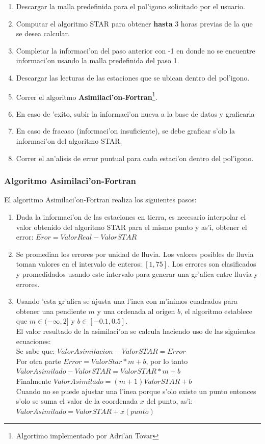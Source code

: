 \begin{enumerate}
 \item Descargar la malla predefinida para el pol'igono solicitado por el usuario.
  \item Computar el algoritmo STAR para obtener \textbf{hasta} 3 horas previas de la que se desea calcular.
  \item Completar la informaci'on del paso anterior con -1 en donde no se encuentre informaci'on usando la malla predefinida del paso 1.
  \item Descargar las lecturas de las estaciones que se ubican dentro del pol'igono.
  \item Correr el algoritmo \textbf{Asimilaci'on-Fortran}\footnote{Algortimo implementado por Adri'an Tovar }.
  \item En caso de 'exito, subir la informaci'on nueva a la base de datos y graficarla
  \item En caso de fracaso (informaci'on insuficiente), se debe graficar s'olo la informaci'on del algoritmo STAR.
  \item Correr el an'alisis de error puntual para cada estaci'on dentro del pol'igono.
\end{enumerate}

\subsubsection*{Algoritmo Asimilaci'on-Fortran}
El algoritmo Asimilaci'on-Fortran realiza los siguientes pasos:
\begin{enumerate}
  \item Dada la informaci'on de las estaciones en tierra, es necesario
    interpolar el valor obtenido del algoritmo STAR para el mismo
    punto y as'i, obtener el error: $Eror=ValorReal-ValorSTAR$ 
  \item Se promedian los errores por unidad de lluvia. Los valores
    posibles de lluvia toman valores en el intervalo de enteros:
    $[1,75]$. Los errores son clasificados y promedidados usando este
    intervalo para generar una gr'afica entre lluvia y errores. 
  \item Usando 'esta gr'afica se ajusta una l'inea con m'inimos cuadrados
    para obtener una pendiente $m$ y una ordenada al origen $b$, el
    algoritmo establece que $m \in (-\infty , 2]$ y $b \in [-0.1
        , 0.5]$. \\
    El valor resultado de la asimilaci'on se calcula
    haciendo uso de las siguientes ecuaciones:\\
    Se sabe que: $ValorAsimilacion - ValorSTAR = Error$\\
    Por otra parte $Error = ValorStar*m+b$, por lo tanto\\
    $ValorAsimilado-ValorSTAR=ValorSTAR*m+b$ \\
    Finalmente $ValorAsimilado = (m+1)ValorSTAR+b$\\
    Cuando no se puede ajustar una l'inea porque s'olo existe un
    punto entonces s'olo se suma el valor de la coordenada $x$ del
    punto, as'i: $ValorAsimilado=ValorSTAR+x(punto)$
\end{enumerate}

